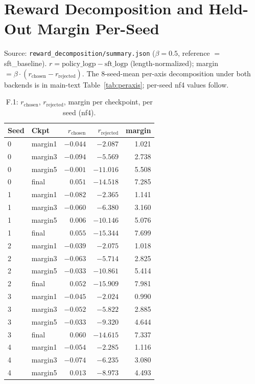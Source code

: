 \section{Reward Decomposition and Held-Out Margin Per-Seed}
\label{app:reward-data}
Source: \texttt{reward\_decomposition/summary.json} ($\beta{=}0.5$, reference $=$ sft\_baseline). $r = \text{policy\_logp} - \text{sft\_logp}$ (length-normalized); margin $= \beta\cdot(r_{\text{chosen}} - r_{\text{rejected}})$. The 8-seed-mean per-axis decomposition under both backends is in main-text Table~\ref{tab:peraxis}; per-seed nf4 values follow.

\begin{table}[H]
\centering
\small
\caption{F.1: $r_{\text{chosen}}$, $r_{\text{rejected}}$, margin per checkpoint, per seed (nf4).}
\label{tab:reward-perseed}
\begin{tabular}{@{}llrrr@{}}
\toprule
Seed & Ckpt & $r_{\text{chosen}}$ & $r_{\text{rejected}}$ & margin\\
\midrule
0 & margin1 & $-0.044$ & $-2.087$ & 1.021\\
0 & margin3 & $-0.094$ & $-5.569$ & 2.738\\
0 & margin5 & $-0.001$ & $-11.016$ & 5.508\\
0 & final & $0.051$ & $-14.518$ & 7.285\\
1 & margin1 & $-0.082$ & $-2.365$ & 1.141\\
1 & margin3 & $-0.060$ & $-6.380$ & 3.160\\
1 & margin5 & $0.006$ & $-10.146$ & 5.076\\
1 & final & $0.055$ & $-15.344$ & 7.699\\
2 & margin1 & $-0.039$ & $-2.075$ & 1.018\\
2 & margin3 & $-0.063$ & $-5.714$ & 2.825\\
2 & margin5 & $-0.033$ & $-10.861$ & 5.414\\
2 & final & $0.052$ & $-15.909$ & 7.981\\
3 & margin1 & $-0.045$ & $-2.024$ & 0.990\\
3 & margin3 & $-0.052$ & $-5.822$ & 2.885\\
3 & margin5 & $-0.033$ & $-9.320$ & 4.644\\
3 & final & $0.060$ & $-14.615$ & 7.337\\
4 & margin1 & $-0.054$ & $-2.285$ & 1.116\\
4 & margin3 & $-0.074$ & $-6.235$ & 3.080\\
4 & margin5 & $0.013$ & $-8.973$ & 4.493\\

\end{tabular}
\end{table}
